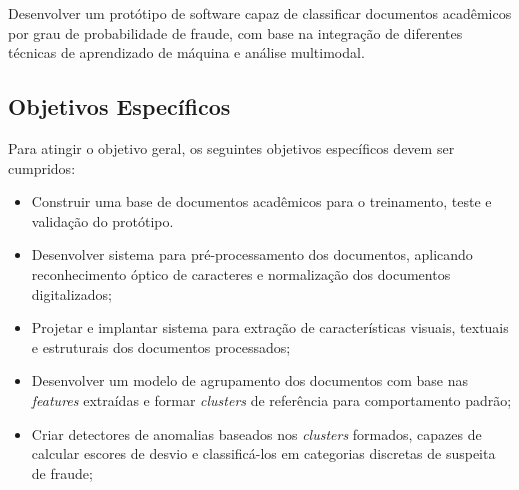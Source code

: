 Desenvolver um protótipo de software capaz de classificar documentos acadêmicos por grau de probabilidade de fraude, com base na integração de diferentes técnicas de aprendizado de máquina e análise multimodal.

\subsection{Objetivos Específicos}

Para atingir o objetivo geral, os seguintes objetivos específicos devem ser cumpridos:

\begin{itemize}
    \item Construir uma base de documentos acadêmicos para o treinamento, teste e validação do protótipo.
    \item Desenvolver sistema para pré-processamento dos documentos, aplicando reconhecimento óptico de caracteres e normalização dos documentos digitalizados;
    \item Projetar e implantar sistema para extração de características visuais, textuais e estruturais dos documentos processados;
    \item Desenvolver um modelo de agrupamento dos documentos com base nas \textit{features} extraídas e formar \textit{clusters} de referência para comportamento padrão;
    \item Criar detectores de anomalias baseados nos \textit{clusters} formados, capazes de calcular escores de desvio e classificá-los em categorias discretas de suspeita de fraude;
\end{itemize}
